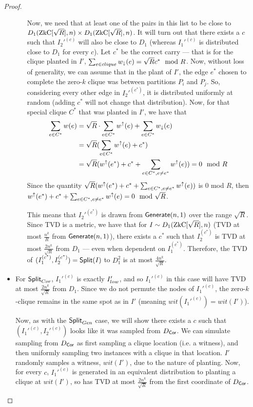 \begin{proof}
\begin{itemize}
\begin{itemize}
			Now, we need that at least one of the pairs in this list to be close to $D_1(\ZkC[\sqrt R], n) \times D_1(\ZkC[\sqrt R], n) $. It will turn out that there exists a $c$ such that $I_2'^{(c)}$ will also be close to $D_1$ (whereas $I_1'^{(c)}$ is distributed close to $D_1$ for every $c$). Let $c^*$ be the correct carry --- that is for the clique planted in $I'$, $\sum_{e \in clique} {w}_\downarrow(e) = \sqrt R c^* \mod R$. Now, without loss of generality, we can assume that in the plant of $I'$, the edge $e^*$ chosen to complete the zero-$k$ clique was between partitions $P_i$ and $P_j$. So, considering every other edge in $I_2'^{(c^*)}$, it is distributed uniformly at random (adding $c^*$ will not change that distribution). Now, for that special clique $C^*$ that was planted in $I'$, we have that
			\begin{align*}
			\sum_{e \in C^*} w(e) &= \sqrt R \cdot \sum_{e \in C^*} {w}^\uparrow(e) + \sum_{e \in C^*} {w}_\downarrow(e)\\
			&= \sqrt R (\sum_{e \in C^*} {w}^\uparrow(e) + c^*)\\
			&= \sqrt R ({w}^\uparrow(e^*) + c^* + \sum_{e \in C^*, e \neq e^*} {w}^\uparrow(e)) = 0 \mod R
			\end{align*}
			Since the quantity $\sqrt R ({w}^\uparrow(e^*) + c^* + \sum_{e \in C^*, e \neq e^*} {w}^\uparrow(e))$ is 0 mod $R$, then ${w}^\uparrow(e^*) + c^* + \sum_{e \in C^*, e \neq e^*} {w}^\uparrow(e) = 0 \mod \sqrt R$.
			
			This means that $I_2'^{(c^*)}$ is drawn from $\mathsf{Generate}(n,1)$ over the range $\sqrt R$. Since TVD is a metric, we have that for $I \sim D_1(\ZkC[\sqrt R], n)$ (TVD at most $\frac {n^k}{R}$ from $\mathsf{Generate}(n, 1)$), there exists a $c^*$ such that $I_2^{(c^*)}$ is TVD at most $\frac{2n^k}{\sqrt R}$ from $D_1$ --- even when dependent on $I_1^{(c^*)}$. Therefore, the TVD of $(I_1^{(c^*)}, I_2^{(c^*)}) = \mathsf{Split}(I)$ to $D_1^2$ is at most $\frac{4 n^k}{\sqrt R}$.
		\end{itemize}
		
		\item For $\mathsf{Split}_{Cor}$, $I_1'^{(c)}$ is exactly $I_{low}'$, and so $I_1'^{(c)}$ in this case will have TVD at most $\frac{2n^k}{\sqrt R}$ from $D_1$. Since we do not permute the nodes of $I_1'^{(c)}$, the zero-$k$-clique remains in the same spot as in $I'$ (meaning $wit(I_1'^{(c)}) = wit(I')$).
		
		Now, as with the $\mathsf{Split}_{Gen}$ case, we will show there exists a $c$ such that $(I_1'^{(c)}, I_2'^{(c)})$ looks like it was sampled from $D_{\mathsf{Cor}}$. We can simulate sampling from $D_{\mathsf{Cor}}$ as first sampling a clique location (i.e. a witness), and then uniformly sampling two instances with a clique in that location. $I'$ randomly samples a witness, $wit(I')$, due to the nature of planting. Now, for every $c$, $I_1'^{(c)}$ is generated in an equivalent distribution to planting a clique at $wit(I')$, so has TVD at most $\frac{2n^k}{\sqrt R}$ from the first coordinate of $D_{\mathsf{Cor}}$.
		

\end{itemize}
\end{proof}
